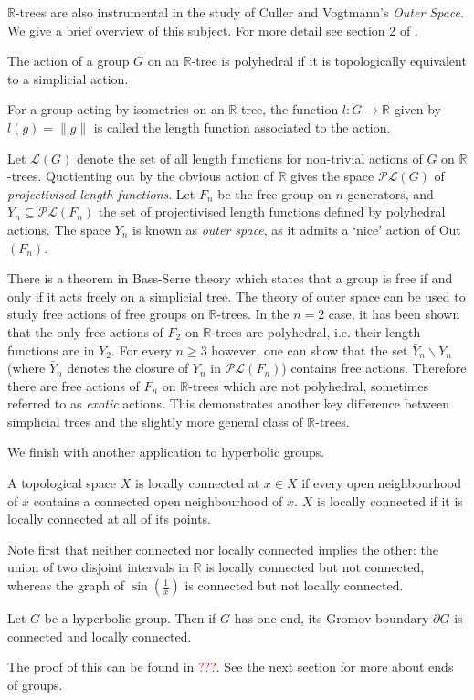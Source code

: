 $\mathbb{R}$-trees are also instrumental in the study of Culler and Vogtmann's \textit{Outer Space}. We give a brief overview of this subject. For more detail see section 2 of \cite{Shalen}.

\begin{definition}
    The action of a group $G$ on an $\mathbb{R}$-tree is \textnormal{polyhedral} if it is topologically equivalent to a simplicial action.
\end{definition}
\begin{definition}
    For a group acting by isometries on an $\mathbb{R}$-tree, the function $l:G\rightarrow\mathbb{R}$ given by $l(g)=\lVert g\rVert$ is called the \textnormal{length function} associated to the action.
\end{definition}

Let $\mathcal{L}(G)$ denote the set of all length functions for non-trivial actions of $G$ on $\mathbb{R}$-trees. Quotienting out by the obvious action of $\mathbb{R}$ gives the space $\mathcal{PL}(G)$ of \textit{projectivised length functions}. Let $F_n$ be the free group on $n$ generators, and $Y_n\subseteq \mathcal{PL}(F_n)$ the set of projectivised length functions defined by polyhedral actions. The space $Y_n$ is known as \textit{outer space}, as it admits a `nice' action of Out$(F_n)$. 

There is a theorem in Bass-Serre theory which states that a group is free if and only if it acts freely on a simplicial tree. The theory of outer space can be used to study free actions of free groups on $\mathbb{R}$-trees. In the $n=2$ case, it has been shown that the only free actions of $F_2$ on $\mathbb{R}$-trees are polyhedral, i.e. their length functions are in $Y_2$. For every $n\geq 3$ however, one can show that the set $\bar{Y}_n\backslash Y_n$ (where $\bar{Y}_n$ denotes the closure of $Y_n$ in $\mathcal{PL}(F_n)$) contains free actions. Therefore there are free actions of $F_n$ on $\mathbb{R}$-trees which are not polyhedral, sometimes referred to as \textit{exotic} actions. This demonstrates another key difference between simplicial trees and the slightly more general class of $\mathbb{R}$-trees.


We finish with another application to hyperbolic groups.
\begin{definition}
    A topological space $X$ is \textnormal{locally connected} at $x\in X$ if every open neighbourhood of $x$ contains a connected open neighbourhood of $x$. $X$ is locally connected if it is locally connected at all of its points.
\end{definition}
Note first that neither connected nor locally connected implies the other: the union of two disjoint intervals in $\mathbb{R}$ is locally connected but not connected, whereas the graph of $\sin(\frac{1}{x})$ is connected but not locally connected.

\begin{theorem}
    Let $G$ be a hyperbolic group. Then if $G$ has one end, its Gromov boundary $\partial G$ is connected and locally connected.
\end{theorem}

The proof of this can be found in \textcolor{red}{???}. See the next section for more about ends of groups.




